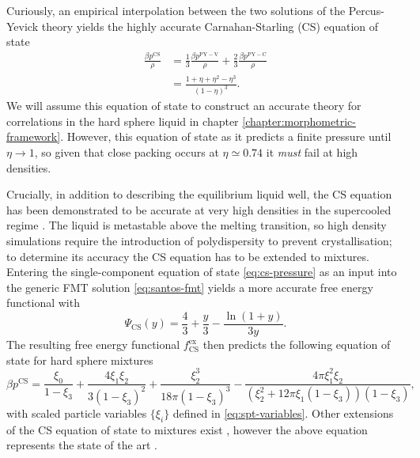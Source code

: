 Curiously, an empirical interpolation between the two solutions of the Percus-Yevick theory yields the highly accurate Carnahan-Starling (CS) equation of state \cite{CarnahanJCP1969}
\begin{equation}\label{eq:cs-pressure}
  \begin{split}
    \frac{\beta p^\mathrm{CS}}{\rho}
    &=
    \frac{1}{3} \frac{\beta p^\mathrm{PY-V}}{\rho}
    + \frac{2}{3} \frac{\beta p^\mathrm{PY-C}}{\rho}
    \\ &=
    \frac{1 + \eta + \eta^2 - \eta^3}{(1-\eta)^3}.
  \end{split}
\end{equation}
We will assume this equation of state to construct an accurate theory for correlations in the hard sphere liquid in chapter \ref{chapter:morphometric-framework}.
However, this equation of state as it predicts a finite pressure until $\eta \to 1$, so given that close packing occurs at $\eta \simeq 0.74$ it \emph{must} fail at high densities.

Crucially, in addition to describing the equilibrium liquid well, the CS equation has been demonstrated to be accurate at very high densities in the supercooled regime \cite{BerthierPRL2016}.
The liquid is metastable above the melting transition, so high density simulations require the introduction of polydispersity %
to prevent crystallisation; to determine its accuracy the CS equation has to be extended to mixtures.
Entering the single-component equation of state \eqref{eq:cs-pressure} as an input into the generic FMT solution \eqref{eq:santos-fmt} yields a more accurate free energy functional with \cite{SantosPRE2012}
\begin{equation}\label{eq:cs-fmt}
  \Psi_\mathrm{CS}(y)
  =
  \frac{4}{3} + \frac{y}{3} - \frac{\ln{(1 + y)}}{3y}.
\end{equation}
The resulting free energy functional $f^\mathrm{ex}_\mathrm{CS}$ then predicts the following equation of state for hard sphere mixtures \cite{SantosPRE2012}
\begin{equation}\label{eq:cs-mixtures}
  \beta p^\mathrm{CS}
  =
  \frac{\xi_0}{1 - \xi_3}
  + \frac{4 \xi_1 \xi_2}{3 (1 - \xi_3)^2}
  + \frac{\xi_2^3}{18 \pi (1 - \xi_3)^3}
  - \frac{4 \pi \xi_1^2 \xi_2}{(\xi_2^2 + 12\pi \xi_1 (1 - \xi_3)) (1 - \xi_3)},
\end{equation}
with scaled particle variables $\{\xi_i\}$ defined in \eqref{eq:spt-variables}.
Other extensions of the CS equation of state to mixtures exist%
,
however the above equation represents the state of the art \cite{SantosPRE2012}.

